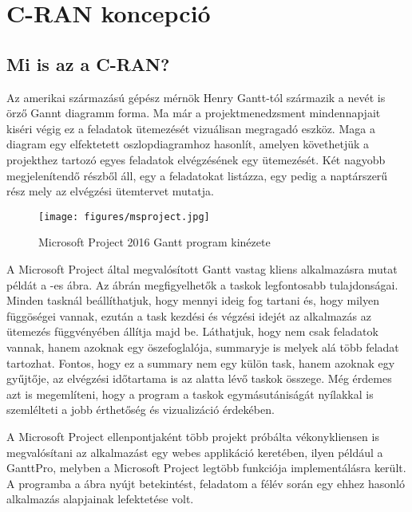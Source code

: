 \chapter{C-RAN koncepció}\label{sect:CranConcept}
\section{Mi is az a C-RAN?}

\hspace{2mm}\cite{RecentCRANProg} \cite{Architecture} \cite{ImplementationIssues} \cite{BenefitsFujitsu} \cite{BenefitsEricsson} \cite{WirelessFull}  \cite{FutureCarrier} \cite{ImplementingGPP} \cite{NokiaSingle} \cite{TechOverview}   Az amerikai származású gépész mérnök Henry Gantt-tól származik a nevét is örző Gannt diagramm forma. Ma már a projektmenedzsment mindennapjait kiséri végig ez a feladatok ütemezését vizuálisan megragadó eszköz. Maga a diagram egy elfektetett oszlopdiagramhoz hasonlít, amelyen követhetjük a projekthez tartozó egyes feladatok elvégzésének egy ütemezését. \cite{GanttChart} Két nagyobb megjelenítendő részből áll, egy a feladatokat listázza, egy pedig a naptárszerű rész mely az elvégzési ütemtervet mutatja. 

\begin{figure}[!ht]
\centering
\texttt{[image: figures/msproject.jpg]}
\caption{Microsoft Project 2016 Gantt program kinézete} 
\label{fig:MSProject}
\end{figure} 

A Microsoft Project által megvalósított Gantt vastag kliens alkalmazásra mutat példát a -es ábra. Az ábrán megfigyelhetők a taskok legfontosabb tulajdonságai. Minden tasknál beállíthatjuk, hogy mennyi ideig fog tartani és, hogy milyen függöségei vannak, ezután a task kezdési és végzési idejét az alkalmazás az ütemezés függvényében állítja majd be. Láthatjuk, hogy nem csak feladatok vannak, hanem azoknak egy öszefoglalója, summaryje is melyek alá több feladat tartozhat. Fontos, hogy ez a summary nem egy külön task, hanem azoknak egy gyűjtője, az elvégzési időtartama is az alatta lévő taskok összege. Még érdemes azt is megemlíteni, hogy a program a taskok egymásutániságát nyílakkal is szemlélteti a jobb érthetőség és vizualizáció érdekében. \cite{RecentCRANProg}

A Microsoft Project ellenpontjaként több projekt próbálta vékonykliensen is megvalósítani az alkalmazást egy webes applikáció keretében, ilyen például a GanttPro, melyben a Microsoft Project legtöbb funkciója implementálásra került. A programba a  ábra nyújt betekintést, feladatom a félév során egy ehhez hasonló alkalmazás alapjainak lefektetése volt.\cite{GanttPro}

